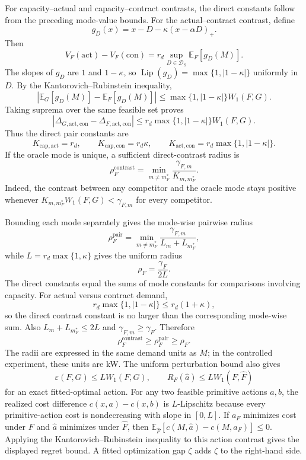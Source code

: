 \documentclass[]{interact}
\begin{document}
For capacity--actual and capacity--contract contrasts, the direct
constants follow from the preceding mode-value bounds. For the
actual--contract contrast, define
\[
g_D(x)=x-D-\kappa(x-\alpha D)_+.
\]
Then
\[
V_F(\mathrm{act})-V_F(\mathrm{con})
=
r_d\sup_{D\in\mathcal D_S}\mathbb E_F[g_D(M)].
\]
The slopes of $g_D$ are $1$ and $1-\kappa$, so
$\operatorname{Lip}(g_D)=\max\{1,|1-\kappa|\}$ uniformly in $D$.
By the Kantorovich--Rubinstein inequality,
\[
\left|
\mathbb E_G[g_D(M)]-\mathbb E_F[g_D(M)]
\right|
\leq
\max\{1,|1-\kappa|\}W_1(F,G).
\]
Taking suprema over the same feasible set proves
\[
|\Delta_{G,\mathrm{act},\mathrm{con}}
-\Delta_{F,\mathrm{act},\mathrm{con}}|
\leq
r_d\max\{1,|1-\kappa|\}W_1(F,G).
\]
Thus the direct pair constants are
\[
K_{\mathrm{cap},\mathrm{act}}=r_d,\qquad
K_{\mathrm{cap},\mathrm{con}}=r_d\kappa,\qquad
K_{\mathrm{act},\mathrm{con}}
=r_d\max\{1,|1-\kappa|\}.
\]
If the oracle mode is unique, a sufficient direct-contrast radius is
\[
\rho_F^{\mathrm{contrast}}
=
\min_{m\neq m_F^\ast}
\frac{\gamma_{F,m}}{K_{m,m_F^\ast}}.
\]
Indeed, the contrast between any competitor and the oracle mode stays
positive whenever $K_{m,m_F^\ast}W_1(F,G)<\gamma_{F,m}$ for every
competitor.

Bounding each mode separately gives the mode-wise pairwise radius
\[
\rho_F^{\mathrm{pair}}
=
\min_{m\neq m_F^\ast}
\frac{\gamma_{F,m}}{L_m+L_{m_F^\ast}},
\]
while $L=r_d\max\{1,\kappa\}$ gives the uniform radius
\[
\rho_F=\frac{\gamma_F}{2L}.
\]
The direct constants equal the sums of mode constants for comparisons
involving capacity. For actual versus contract demand,
\[
r_d\max\{1,|1-\kappa|\}
\leq r_d(1+\kappa),
\]
so the direct contrast constant is no larger than the corresponding
mode-wise sum. Also $L_m+L_{m_F^\ast}\leq2L$ and
$\gamma_{F,m}\geq\gamma_F$. Therefore
\[
\rho_F^{\mathrm{contrast}}
\geq\rho_F^{\mathrm{pair}}
\geq\rho_F.
\]
The radii are expressed in the same demand units as $M$; in the
controlled experiment, these units are kW. The uniform perturbation
bound also gives
\[
\varepsilon(F,G)\leq LW_1(F,G),
\qquad
R_F(\widehat a)\leq LW_1(F,\widehat F)
\]
for an exact fitted-optimal action. For any two feasible primitive
actions $a,b$, the realized cost difference $c(x,a)-c(x,b)$ is
$L$-Lipschitz because every primitive-action cost is nondecreasing
with slope in $[0,L]$. If $a_F$ minimizes cost under $F$ and
$\widehat a$ minimizes under $\widehat F$, then
$\mathbb E_{\widehat F}[c(M,\widehat a)-c(M,a_F)]\leq0$.
Applying the Kantorovich--Rubinstein inequality to this action
contrast gives the displayed regret bound. A fitted optimization
gap $\zeta$ adds $\zeta$ to the right-hand side.
\end{document}
